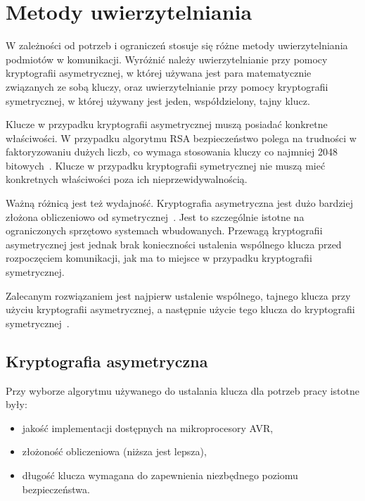 \chapter{Metody uwierzytelniania}
\label{cha:metodyUwierzytelniania}

W zależności od potrzeb i ograniczeń stosuje się różne metody uwierzytelniania podmiotów w komunikacji. Wyróżnić należy uwierzytelnianie przy pomocy kryptografii asymetrycznej, w której używana jest para matematycznie związanych ze sobą kluczy, oraz uwierzytelnianie przy pomocy kryptografii symetrycznej, w której używany jest jeden, współdzielony, tajny klucz.

Klucze w przypadku kryptografii asymetrycznej muszą posiadać konkretne właściwości. W przypadku algorytmu RSA bezpieczeństwo polega na trudności w faktoryzowaniu dużych liczb, co wymaga stosowania kluczy co najmniej 2048 bitowych~\cite{Nist}. Klucze w przypadku kryptografii symetrycznej nie muszą mieć konkretnych właściwości poza ich nieprzewidywalnością.

Ważną różnicą jest też wydajność. Kryptografia asymetryczna jest dużo bardziej złożona obliczeniowo od symetrycznej~\cite{al2008comparative}. Jest to szczególnie istotne na ograniczonych sprzętowo systemach wbudowanych. Przewagą kryptografii asymetrycznej jest jednak brak konieczności ustalenia wspólnego klucza przed rozpoczęciem komunikacji, jak ma to miejsce w przypadku kryptografii symetrycznej.

Zalecanym rozwiązaniem jest najpierw ustalenie wspólnego, tajnego klucza przy użyciu kryptografii asymetrycznej, a następnie użycie tego klucza do kryptografii symetrycznej~\cite{al2008comparative}.

\section{Kryptografia asymetryczna}
\label{sec:kryptoAsym}

Przy wyborze algorytmu używanego do ustalania klucza dla potrzeb pracy istotne były:

\begin{itemize}
\item jakość implementacji dostępnych na mikroprocesory AVR,
\item złożoność obliczeniowa (niższa jest lepsza),
\item długość klucza wymagana do zapewnienia niezbędnego poziomu bezpieczeństwa.
\end{itemize}

